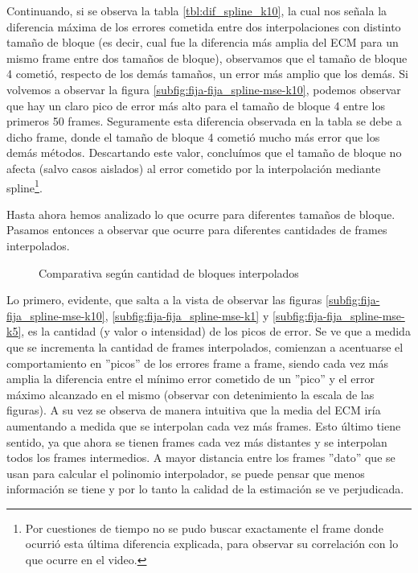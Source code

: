 \par Continuando, si se observa la tabla \ref{tbl:dif_spline_k10}, la cual nos
se\~nala la diferencia m\'axima de los errores cometida entre dos interpolaciones
con distinto tama\~no de bloque (es decir, cual fue la diferencia m\'as amplia
del ECM para un mismo frame entre dos tama\~nos de bloque), observamos que
el tama\~no de bloque 4 cometi\'o, respecto de los dem\'as tama\~nos, un error
m\'as amplio que los dem\'as. Si volvemos a observar la figura
\ref{subfig:fija-fija_spline-mse-k10}, podemos observar que hay un claro pico
de error m\'as alto para el tama\~no de bloque 4 entre los primeros 50 frames.
Seguramente esta diferencia observada en la tabla se debe a dicho frame, donde
el tama\~no de bloque 4 cometi\'o mucho m\'as error que los dem\'as m\'etodos.
Descartando este valor, conclu\'imos que el tama\~no de bloque no afecta (salvo
casos aislados) al error cometido por la interpolaci\'on mediante
spline\footnote{Por cuestiones de tiempo no se pudo buscar exactamente el frame
donde ocurri\'o esta \'ultima diferencia explicada, para observar su
correlaci\'on con lo que ocurre en el video.}.

\par Hasta ahora hemos analizado lo que ocurre para diferentes tama\~nos de
bloque. Pasamos entonces a observar que ocurre para diferentes cantidades de
frames interpolados.

\begin{figure}[H]
    \centering
    \caption{Comparativa seg\'un cantidad de bloques interpolados}
    \label{fig:fija-fija_spline-frames-interpolados}
\end{figure}

\par Lo primero, evidente, que salta a la vista de observar las figuras
\ref{subfig:fija-fija_spline-mse-k10}, \ref{subfig:fija-fija_spline-mse-k1} y
\ref{subfig:fija-fija_spline-mse-k5}, es la cantidad (y valor o intensidad) de
los picos de error. Se ve que a medida que se incrementa la cantidad de frames
interpolados, comienzan a acentuarse el comportamiento en ''picos'' de los
errores frame a frame, siendo cada vez m\'as amplia la diferencia entre el
m\'inimo error cometido de un ''pico'' y el error m\'aximo alcanzado en el mismo
(observar con detenimiento la escala de las figuras). A su vez se observa de
manera intuitiva que la media del ECM ir\'ia aumentando a medida que se interpolan
cada vez m\'as frames. Esto \'ultimo tiene sentido, ya que ahora se tienen frames
cada vez m\'as distantes y se interpolan todos los frames intermedios. A mayor
distancia entre los frames ''dato'' que se usan para calcular el polinomio
interpolador, se puede pensar que menos informaci\'on se tiene y por lo tanto
la calidad de la estimaci\'on se ve perjudicada.

